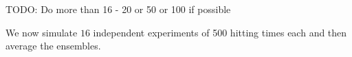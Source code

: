 \documentclass{article}
\begin{document}
 

TODO: Do more than 16 - 20 or 50 or 100 if possible

We now simulate $16$ independent experiments of 500 hitting times each and
then average the ensembles.
\end{document}
